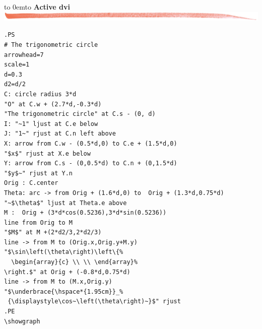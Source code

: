 \documentclass[12pt]{article}
\def\keymenu#1{\textcolor{red}{\underline{#1}}}
\def\advifooter{\vbox to 0em{\vbox to \vsize {\vfill
Press: \keymenu{n}ext page \keymenu{p}revious page
\keymenu{\textvisiblespace} next pause%
} \vss}}
\def\adviheader{\noindent
{\bf\Large Active dvi}\\
\includegraphics[width=\textwidth]{../tex/bar.jpg.eps}}
\let \Newpage \newpage
\def \newpage {\Newpage \advifooter\adviheader}
\def\adviquitfooter{\vbox to 0em{\vbox to \vsize {\vfill
\hfill Press: \keymenu{q} to quit%
} \vss}}
\def\lastpage{\Newpage\adviquitfooter\adviheader}
\begin{document}
\lastpage

\begin{small}
\begin{verbatim}
.PS
# The trigonometric circle
arrowhead=7
scale=1
d=0.3
d2=d/2
C: circle radius 3*d
"O" at C.w + (2.7*d,-0.3*d)
"The trigonometric circle" at C.s - (0, d)
I: "~1" ljust at C.e below
J: "1~" rjust at C.n left above
X: arrow from C.w - (0.5*d,0) to C.e + (1.5*d,0)
"$x$" rjust at X.e below
Y: arrow from C.s - (0,0.5*d) to C.n + (0,1.5*d)
"$y$~" rjust at Y.n
Orig : C.center
Theta: arc -> from Orig + (1.6*d,0) to  Orig + (1.3*d,0.75*d)
"~$\theta$" ljust at Theta.e above
M :  Orig + (3*d*cos(0.5236),3*d*sin(0.5236))
line from Orig to M
"$M$" at M +(2*d2/3,2*d2/3)
line -> from M to (Orig.x,Orig.y+M.y)
"$\sin\left(\theta\right)\left\{%
  \begin{array}{c} \\ \\ \end{array}%
\right.$" at Orig + (-0.8*d,0.75*d)
line -> from M to (M.x,Orig.y)
"$\underbrace{\hspace*{1.95cm}}_%
 {\displaystyle\cos~\left(\theta\right)~}$" rjust
.PE
\showgraph
\end{verbatim}
\end{small}
\end{document}
